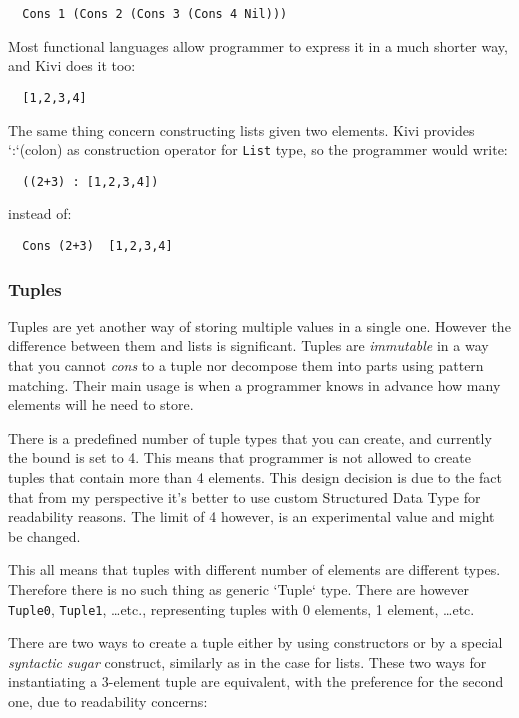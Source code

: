 \documentclass[a4paper]{report}
\begin{document}
\begin{verbatim}
  Cons 1 (Cons 2 (Cons 3 (Cons 4 Nil)))
\end{verbatim}

Most functional languages allow programmer to express it in a much shorter way,
and Kivi does it too:

\begin{verbatim}
  [1,2,3,4]
\end{verbatim}

The same thing concern constructing lists given two elements. Kivi provides
`:`(colon) as construction operator for \texttt{List} type, so the programmer
would write:

\begin{verbatim}
  ((2+3) : [1,2,3,4])
\end{verbatim}
instead of:

\begin{verbatim}
  Cons (2+3)  [1,2,3,4]
\end{verbatim}

\subsubsection{Tuples}
Tuples are yet another way of storing multiple values in a single one. However
the difference between them and lists is significant. Tuples are
\textit{immutable} in a way that you cannot \textit{cons} to a tuple nor
decompose them into parts using pattern matching. Their main usage is when a
programmer knows in advance how many elements will he need to store.

There is a predefined number of tuple types that you can create, and currently
the bound is set to 4. This means that programmer is not allowed to create
tuples that contain more than 4 elements. This design decision is due to the
fact that from my perspective it's better to use custom Structured Data Type
for readability reasons. The limit of 4 however, is an experimental value and
might be changed.

This all means that tuples with different number of elements are different
types. Therefore there is no such thing as generic `Tuple` type. There are
however \texttt{Tuple0}, \texttt{Tuple1}, \ldots etc., representing tuples with
0 elements, 1 element, \ldots etc.

There are two ways to create a tuple either by using constructors or by a
special \textit{syntactic sugar} construct, similarly as in the case for lists.
These two ways for instantiating a 3-element tuple are equivalent, with the
preference for the second one, due to readability concerns:
\end{document}
